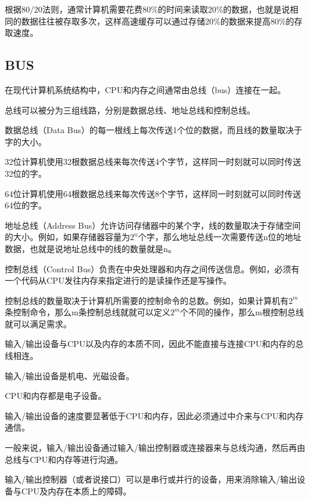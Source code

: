 根据80/20法则，通常计算机需要花费80\%的时间来读取20\%的数据，也就是说相同的数据往往被存取多次，这样高速缓存可以通过存储20\%的数据来提高80\%的存取速度。





\subsection{BUS}


在现代计算机系统结构中，CPU和内存之间通常由总线（bus）连接在一起。

总线可以被分为三组线路，分别是数据总线、地址总线和控制总线。



数据总线（Data Bus）的每一根线上每次传送1个位的数据，而且线的数量取决于字的大小。

\begin{compactitem}
\item 32位计算机使用32根数据总线来每次传送4个字节，这样同一时刻就可以同时传送32位的字。
\item 64位计算机使用64根数据总线来每次传送8个字节，这样同一时刻就可以同时传送64位的字。
\end{compactitem}

地址总线（Address Bus）允许访问存储器中的某个字，线的数量取决于存储空间的大小。例如，如果存储器容量为$2^n$个字，那么地址总线一次需要传送n位的地址数据，也就是说地址总线中的线的数量就是n。

控制总线（Control Bus）负责在中央处理器和内存之间传送信息。例如，必须有一个代码从CPU发往内存来指定进行的是读操作还是写操作。

控制总线的数量取决于计算机所需要的控制命令的总数。例如，如果计算机有$2^m$条控制命令，那么m条控制总线就就可以定义$2^m$个不同的操作，那么m根控制总线就可以满足需求。


输入/输出设备与CPU以及内存的本质不同，因此不能直接与连接CPU和内存的总线相连。

\begin{compactitem}
\item 输入/输出设备是机电、光磁设备。
\item CPU和内存都是电子设备。
\end{compactitem}

输入/输出设备的速度要显著低于CPU和内存，因此必须通过中介来与CPU和内存通信。

一般来说，输入/输出设备通过输入/输出控制器或连接器来与总线沟通，然后再由总线与CPU和内存等进行沟通。

输入/输出控制器（或者说接口）可以是串行或并行的设备，用来消除输入/输出设备与CPU及内存在本质上的障碍。

